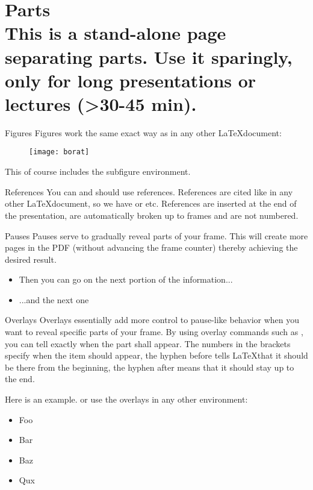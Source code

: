 \documentclass{beamer}
\begin{document}
\part{{\bf Parts} \protect\\ This is a stand-alone page separating parts. Use it sparingly, only for long presentations or lectures (>30-45 min).}
\frame{\partpage}

\begin{frame}{Figures}
Figures work the same exact way as in any other \LaTeX document:
\begin{figure}
\centering
  \texttt{[image: borat]}\\
\end{figure}
This of course includes the subfigure environment.
\end{frame}

\begin{frame}{References}
You can and should use references. References are cited like in any other \LaTeX document, so we have \cite{Takacs2016b} or \cite{Asato2015,Stark2013} etc. References are inserted at the end of the presentation, are automatically broken up to frames and are not numbered.
\end{frame}

\begin{frame}{Pauses}
Pauses serve to gradually reveal parts of your frame. This will create more pages in the PDF (without advancing the frame counter) thereby achieving the desired result.
\pause
\begin{itemize}
\item Then you can go on the next portion of the information...
\pause
\item ...and the next one
\end{itemize}
\end{frame}

\begin{frame}{Overlays}
Overlays essentially add more control to pause-like behavior when you want to reveal specific parts of your frame. By using overlay commands such as , you can tell exactly when the part shall appear. The numbers in the brackets specify when the item should appear, the hyphen before tells \LaTeX that it should be there from the beginning, the hyphen after means that it should stay up to the end.

Here is an example.    or use the overlays in any other environment:

\begin{itemize}
\item<1-> Foo
\item<3-> Bar
\item<-2> Baz
\item<1,4> Qux
\end{itemize}
\end{frame}
\end{document}

